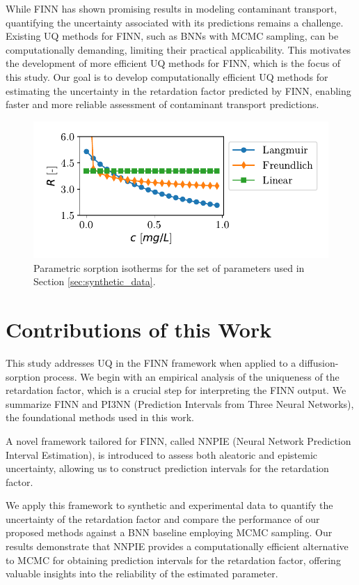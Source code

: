 While FINN has shown promising results in modeling contaminant transport, quantifying the uncertainty associated with its predictions remains a challenge. Existing UQ methods for FINN, such as BNNs with MCMC sampling, can be computationally demanding, limiting their practical applicability. This motivates the development of more efficient UQ methods for FINN, which is the focus of this study. Our goal is to develop computationally efficient UQ methods for estimating the uncertainty in the retardation factor predicted by FINN, enabling faster and more reliable assessment of contaminant transport predictions.

\begin{figure}[h]
    \centering
    \includegraphics{figs/parametric_isotherms.pdf}
    \caption{Parametric sorption isotherms for the set of parameters used in Section \vref{sec:synthetic_data}.}
    \label{fig:parametric_isotherms}
\end{figure}


\section{Contributions of this Work}
This study addresses UQ in the FINN framework when applied to a diffusion-sorption process. We begin with an empirical analysis of the uniqueness of the retardation factor, which is a crucial step for interpreting the FINN output. We summarize FINN and PI3NN (Prediction Intervals from Three Neural Networks), the foundational methods used in this work.

A novel framework tailored for FINN, called NNPIE (Neural Network Prediction Interval Estimation), is introduced to assess both aleatoric and epistemic uncertainty, allowing us to construct prediction intervals for the retardation factor.

We apply this framework to synthetic and experimental data to quantify the uncertainty of the retardation factor and compare the performance of our proposed methods against a BNN baseline employing MCMC sampling. Our results demonstrate that NNPIE provides a computationally efficient alternative to MCMC for obtaining prediction intervals for the retardation factor, offering valuable insights into the reliability of the estimated parameter.



